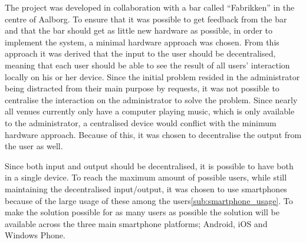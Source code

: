 The project was developed in collaboration with a bar called \enquote{Fabrikken} in the centre of Aalborg. To ensure that it was possible to get feedback from the bar and that the bar should get as little new hardware as possible, in order to implement the system, a minimal hardware approach was chosen.
From this approach it was derived that the input to the user should be decentralised, meaning that each user should be able to see the result of all users' interaction locally on his or her device.
Since the initial problem resided in the administrator being distracted from their main purpose by requests, it was not possible to centralise the interaction on the administrator to solve the problem. Since nearly all venues currently only have a computer playing music, which is only available to the administrator, a centralised device would conflict with the minimum hardware approach. Because of this, it was chosen to decentralise the output from the user as well.

Since both input and output should be decentralised, it is possible to have both in a single device.
To reach the maximum amount of possible users, while still maintaining the decentralised input/output, it was chosen to use smartphones because of the large usage of these among the users\cref{sub:smartphone_usage}. To make the solution possible for as many users as possible the solution will be available across the three main smartphone platforms; Android, iOS and Windows Phone.